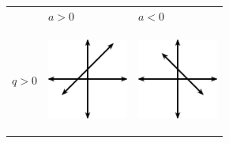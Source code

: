 \begin{center}
\label{m39338*uid82}
\noindent
{}
\tablelasttail{}
\begin{xtabular*}{\mytablewidth}[t]{|p{10\mystarwidth}|p{10\mystarwidth}|p{10\mystarwidth}|}\hline
&
    $a>0$
    &
    $a<0$
\tabularnewline{}
    $q>0$
    &
\setcounter{subfigure}{0}
\label{m39338*id238303}
\begin{center}
\label{m39338*id238303!!!underscore!!!media}\label{m39338*id238303!!!underscore!!!printimage}\includegraphics[width=100px]{col11306.imgs/m39338_MG10C11_006.png} %
\vspace{2pt}
\vspace{.1in}
\end{center}    
    &
\setcounter{subfigure}{0}
\label{m39338*id238315}
\begin{center}
\label{m39338*id238315!!!underscore!!!media}\label{m39338*id238315!!!underscore!!!printimage}\includegraphics[width=100px]{col11306.imgs/m39338_MG10C11_007.png} %

\end{center}
\end{xtabular*}
\end{center}
